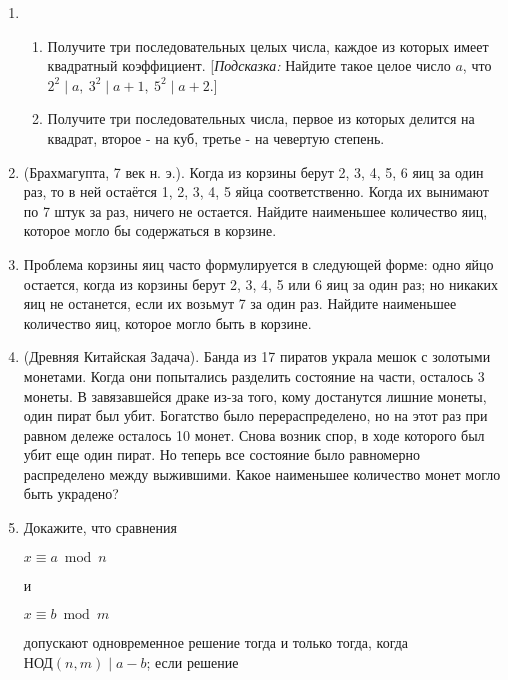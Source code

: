 \documentclass[11pt]{article}
\begin{document}
\begin{enumerate}
	\item
		\begin{enumerate} 
			\item Получите три последовательных целых числа, каждое из которых имеет квадратный коэффициент. [\textit{Подсказка:} Найдите такое целое число $a$, что $2^{2}\mid a,\:3^{2}\mid a + 1,\:5^{2}\mid a + 2$.]
			\item Получите три последовательных числа, первое из которых делится на квадрат, второе - на куб, третье - на чевертую степень.
		\end{enumerate}
	\item (Брахмагупта, 7 век н. э.). Когда из корзины берут 2, 3, 4, 5, 6 яиц за один раз, то в ней остаётся 1, 2, 3, 4, 5 яйца соответственно. Когда их вынимают по 7 штук за раз, ничего не остается. Найдите наименьшее количество яиц, которое могло бы содержаться в корзине.
	\item Проблема корзины яиц часто формулируется в следующей форме: одно яйцо остается, когда из корзины берут 2, 3, 4, 5 или 6 яиц за один раз; но никаких яиц не останется, если их возьмут 7 за один раз. Найдите наименьшее количество яиц, которое могло быть в корзине.
	\item (Древняя Китайская Задача). Банда из 17 пиратов украла мешок с золотыми монетами. Когда они попытались разделить состояние на части, осталось 3 монеты. В завязавшейся драке из-за того, кому достанутся лишние монеты, один пират был убит. Богатство было перераспределено, но на этот раз при равном дележе осталось 10 монет. Снова возник спор, в ходе которого был убит еще один пират. Но теперь все состояние было равномерно распределено между выжившими. Какое наименьшее количество монет могло быть украдено?
	\item Докажите, что сравнения
	\begin{center}
		\begin{minipage}{0.2\textwidth}
			\begin{flushleft}
				$x\equiv a\bmod{n}$
			\end{flushleft}
		\end{minipage}
		и
	 	\begin{minipage}{0.2\textwidth}
	 		\begin{flushright}
	 			$x\equiv b\bmod{m}$	
	 		\end{flushright}
 		\end{minipage}	
	\end{center}
	допускают одновременное решение тогда и только тогда, когда $\text{НОД}(n,m)\mid a - b$; если решение

\end{enumerate}
\end{document}
